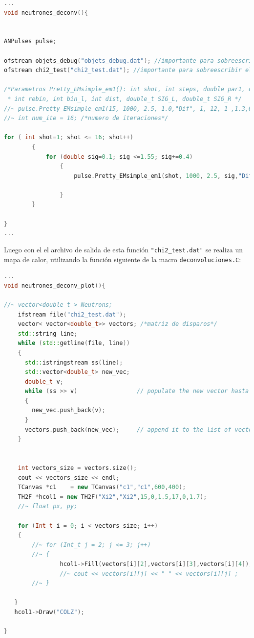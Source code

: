 \documentclass[11pt,letterpaper]{article}
\begin{document}
\begin{lstlisting}[language=c++]
...
void neutrones_deconv(){


ANPulses pulse;

ofstream objets_debug("objets_debug.dat"); //importante para sobreescribir el archivo.
ofstream chi2_test("chi2_test.dat"); //importante para sobreescribir el archivo.

/*Parametros Pretty_EMsimple_em1(): int shot, int steps, double par1, double par2, TString Type, 
 * int rebin, int bin_l, int dist, double_t SIG_L, double_t SIG_R */
//~ pulse.Pretty_EMsimple_em1(15, 1000, 2.5, 1.0,"Dif", 1, 12, 1 ,1.3,0.5);
//~ int num_ite = 16; /*numero de iteraciones*/

for ( int shot=1; shot <= 16; shot++)
		{
			for (double sig=0.1; sig <=1.55; sig+=0.4)
				{
					pulse.Pretty_EMsimple_em1(shot, 1000, 2.5, sig,"Dif", 1, 12, 1 ,1.3,0.5);

				}
		}

}
...
\end{lstlisting}

Luego con el  el archivo de salida de esta función \verb|"chi2_test.dat"| se realiza un mapa de calor, utilizando la función siguiente de la macro \verb|deconvoluciones.C|:

\begin{lstlisting}[language=c++]
...
void neutrones_deconv_plot(){

//~ vector<double_t > Neutrons;
	ifstream file("chi2_test.dat"); 
	vector< vector<double_t>> vectors; /*matriz de disparos*/
	std::string line;
	while (std::getline(file, line))
	{
	  std::istringstream ss(line);
	  std::vector<double_t> new_vec;
	  double_t v;
	  while (ss >> v)                 // populate the new vector hasta donde haya doubles
	  {
		new_vec.push_back(v);
	  }
	  vectors.push_back(new_vec);     // append it to the list of vectors
	}

	
	int vectors_size = vectors.size();
	cout << vectors_size << endl;
	TCanvas *c1    = new TCanvas("c1","c1",600,400);
	TH2F *hcol1 = new TH2F("Xi2","Xi2",15,0,1.5,17,0,1.7);
	//~ float px, py;
	
	for (Int_t i = 0; i < vectors_size; i++)
	{
		//~ for (Int_t j = 2; j <= 3; j++)
		//~ {
				hcol1->Fill(vectors[i][2],vectors[i][3],vectors[i][4]);
				//~ cout << vectors[i][j] << " " << vectors[i][j] ;
		//~ }
		
   }
   hcol1->Draw("COLZ");

}
\end{lstlisting}
\end{document}

